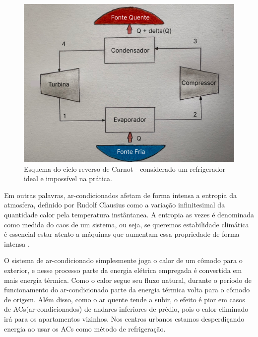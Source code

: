 \begin{figure}[h]
    \centering
    \includegraphics[scale=0.25]{pictures/carnot.png}
    \caption{Esquema do ciclo reverso de Carnot - considerado um refrigerador ideal e impossível na prática.}
    \label{carnot}
\end{figure}

Em outras palavras, ar-condicionados afetam de forma intensa a entropia da atmosfera, definido por Rudolf Clausius como a variação infinitesimal da quantidade calor pela temperatura instântanea. A entropia as vezes é denominada como medida do caos de um sistema, ou seja, se queremos estabilidade climática é essencial estar atento a máquinas que aumentam essa propriedade de forma intensa \cite{Clausius}.

O sistema de ar-condicionado simplesmente joga o calor de um cômodo para o exterior, e nesse processo parte da energia elétrica empregada é convertida em mais energia térmica. Como o calor segue seu fluxo natural, durante o período de funcionamento do ar-condicionado parte da energia térmica volta para o cômodo de origem. Além disso, como o ar quente tende a subir, o efeito é pior em casos de ACs(ar-condicionados) de andares inferiores de prédio, pois o calor eliminado irá para os apartamentos vizinhos. Nos centros urbanos estamos desperdiçando energia ao usar os ACs como método de refrigeração.

